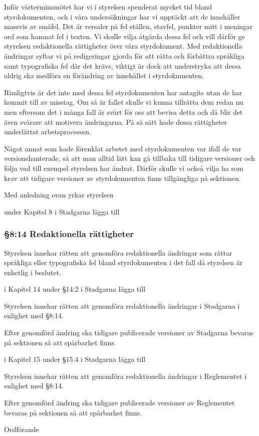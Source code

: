 \documentclass[../_main/handlingar.tex]{subfiles}
\begin{document}

Inför vårterminsmötet har vi i styrelsen spenderat mycket tid bland styrdokumenten, och i våra undersökningar har vi upptäckt att de innehåller massvis av småfel. Det är versaler på fel ställen, stavfel, punkter mitt i meningar ord som hamnat fel i texten. Vi skulle vilja åtgärda dessa fel och vill därför ge styrelsen redaktionella rättigheter över våra styrdokument. Med redaktionella ändringar syftar vi på redigeringar gjorda för att rätta och förbättra språkliga samt typografiska fel där det krävs, viktigt är dock att understryka att dessa aldrig ska medföra en förändring av innehållet i styrdokumenten.

Rimligtvis är det inte med dessa fel styrdokumenten har antagits utan de har kommit till av misstag. Om så är fallet skulle vi kunna tillrätta dem redan nu men eftersom det i många fall är svårt för oss att bevisa detta och då blir det även svårare att motivera ändringarna. På så sätt hade dessa rättigheter underlättat arbetsprocessen.
 
Något annat som hade förenklat arbetet med styrdokumenten var ifall de var versionshanterade, så att man alltid lätt kan gå tillbaka till tidigare versioner och följa vad till exempel styrelsen har ändrat. Därför skulle vi också vilja ha som krav att tidigare versioner av styrdokumenten finns tillgängliga på sektionen.

Med anledning ovan yrkar styrelsen
\begin{attsatser}
    \att under Kapitel 8 i Stadgarna lägga till

    \subsubsection{§8:14 Redaktionella rättigheter}
    
    Styrelsen innehar rätten att genomföra redaktionella ändringar som rättar språkliga eller typografiska fel bland styrdokumenten i det fall då styrelsen är enhetlig i beslutet. 

    \att i  Kapitel 14 under §14:2 i Stadgarna lägga till 
    
    Styrelsen innehar rätten att genomföra redaktionella ändringar i Stadgarna i enlighet med §8:14.
    
    Efter genomförd ändring ska tidigare publicerade versioner av Stadgarna bevaras på sektionen så att spårbarhet finns.


    \att i  Kapitel 15 under §15.4 i Stadgarna lägga till 
    
    Styrelsen innehar rätten att genomföra redaktionella ändringar i Reglementet i enlighet med §8:14.
    
    Efter genomförd ändring ska tidigare publicerade versioner av Reglementet bevaras på sektionen så att spårbarhet finns.
 

\end{attsatser}

\begin{signatures}{1}
    \ist
    \signature{\ordf}{Ordförande}
\end{signatures}
\end{document}
